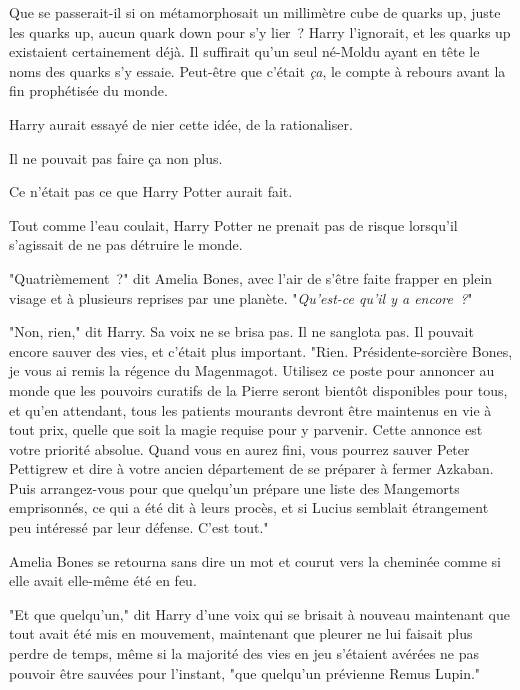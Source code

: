 Que se passerait-il si on métamorphosait un millimètre cube de quarks up, juste les quarks up, aucun quark down pour s'y lier~? Harry l'ignorait, et les quarks up existaient certainement déjà. Il suffirait qu'un seul né-Moldu ayant en tête le noms des quarks s'y essaie. Peut-être que c'était \emph{ça}, le compte à rebours avant la fin prophétisée du monde.

Harry aurait essayé de nier cette idée, de la rationaliser.

Il ne pouvait pas faire ça non plus.

Ce n'était pas ce que Harry Potter aurait fait.

Tout comme l'eau coulait, Harry Potter ne prenait pas de risque lorsqu'il s'agissait de ne pas détruire le monde.

"Quatrièmement~?" dit Amelia Bones, avec l'air de s'être faite frapper en plein visage et à plusieurs reprises par une planète. "\emph{Qu'est-ce qu'il y a encore~?}"

"Non, rien," dit Harry. Sa voix ne se brisa pas. Il ne sanglota pas. Il pouvait encore sauver des vies, et c'était plus important. "Rien. Présidente-sorcière Bones, je vous ai remis la régence du Magenmagot. Utilisez ce poste pour annoncer au monde que les pouvoirs curatifs de la Pierre seront bientôt disponibles pour tous, et qu'en attendant, tous les patients mourants devront être maintenus en vie à tout prix, quelle que soit la magie requise pour y parvenir. Cette annonce est votre priorité absolue. Quand vous en aurez fini, vous pourrez sauver Peter Pettigrew et dire à votre ancien département de se préparer à fermer Azkaban. Puis arrangez-vous pour que quelqu'un prépare une liste des Mangemorts emprisonnés, ce qui a été dit à leurs procès, et si Lucius semblait étrangement peu intéressé par leur défense. C'est tout."

Amelia Bones se retourna sans dire un mot et courut vers la cheminée comme si elle avait elle-même été en feu.

"Et que quelqu'un," dit Harry d'une voix qui se brisait à nouveau maintenant que tout avait été mis en mouvement, maintenant que pleurer ne lui faisait plus perdre de temps, même si la majorité des vies en jeu s'étaient avérées ne pas pouvoir être sauvées pour l'instant, "que quelqu'un prévienne Remus Lupin." 

